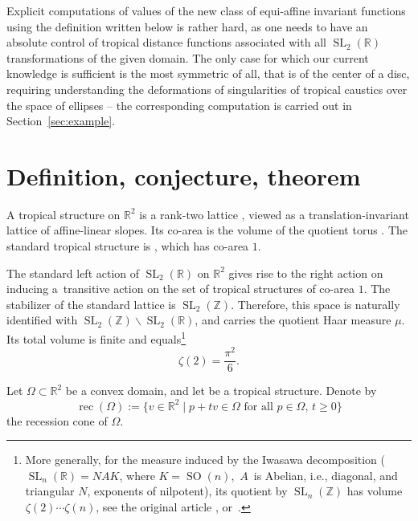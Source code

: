 \documentclass[10pt,a4paper]{amsart}
\numberwithin{equation}{section}
\theoremstyle{definition}
\begin{document}
Explicit computations of values of the new class of equi-affine invariant functions using the definition written below is rather hard, as one needs to have an absolute control of tropical distance functions associated with all $\operatorname{SL}_2(\mathbb{R})$ transformations of the given domain. The only case for which our current knowledge is sufficient is the most symmetric of all, that is of the center of a disc, requiring understanding the deformations of singularities of tropical caustics over the space of ellipses -- the corresponding computation is carried out in Section~\ref{sec:example}.


\section{Definition, conjecture, theorem}

A tropical structure on $\mathbb{R}^2$ is a rank-two lattice , viewed as a translation-invariant lattice of affine-linear slopes. Its co-area is the volume of the quotient torus . The standard tropical structure is , which has co-area $1$.

The standard left action of $\operatorname{SL}_2(\mathbb{R})$ on $\mathbb{R}^2$ gives rise to the right action on  inducing a~transitive action on the set of tropical structures of co-area $1$. The stabilizer of the standard lattice is $\operatorname{SL}_2(\mathbb{Z})$. Therefore, this space is naturally identified with
$\operatorname{SL}_2(\mathbb{Z})\backslash \operatorname{SL}_2(\mathbb{R})$,
and carries the quotient Haar measure $\mu$.
Its total volume is finite and equals\footnote{More generally, for the measure induced by the Iwasawa decomposition ($\operatorname{SL}_n(\mathbb{R})=NAK$, where ${K=\operatorname{SO}(n)}$,~$A$~is Abelian, i.e., diagonal, and triangular $N$, exponents of nilpotent), its quotient by $\operatorname{SL}_n(\mathbb{Z})$ has volume $\zeta(2)\cdots\zeta(n)$, see the original article \cite{siegel}, or~\cite{garrett}.}
\[
\zeta(2)=\frac{\pi^2}{6}.
\]

Let $\Omega \subset \mathbb{R}^2$ be a convex domain, and let  be a tropical structure. Denote by
\[
\operatorname{rec}(\Omega):=\bigl\{v\in \mathbb{R}^2 \mid p+tv\in \Omega \text{ for all } p\in \Omega,\, t\ge 0\bigr\}
\]
the recession cone of $\Omega$.
\end{document}
